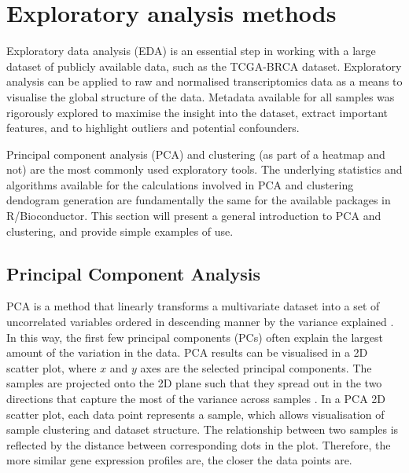     
    
    
\section{Exploratory analysis methods}
    
    Exploratory data analysis (EDA) is an essential step in working with a large dataset of publicly available data, such as the TCGA-BRCA dataset. Exploratory analysis can be applied to raw and normalised transcriptomics data as a means to visualise the global structure of the data. Metadata available for all samples was rigorously explored to maximise the insight into the dataset, extract important features, and to highlight outliers and potential confounders.
    
    Principal component analysis (PCA) and clustering (as part of a heatmap and not) are the most commonly used exploratory tools. The underlying statistics and algorithms available for the calculations involved in PCA and clustering dendogram generation are fundamentally the same for the available packages in R/Bioconductor. This section will present a general introduction to PCA and clustering, and provide simple examples of use.

    \subsection{Principal Component Analysis}
    
    PCA is a method that linearly transforms a multivariate dataset into a set of uncorrelated variables ordered in descending manner by the variance explained \cite{jolliffe2002principal}. In this way, the first few principal components (PCs) often explain the largest amount of the variation in the data. PCA results can be visualised in a 2D scatter plot, where $x$ and $y$ axes are the selected principal components. The samples are projected onto the 2D plane such that they spread out in the two directions that capture the most of the variance across samples \cite{Love2016RNA-SeqApproved}. 
    In a PCA 2D scatter plot, each data point represents a sample, which allows visualisation of sample clustering and dataset structure.  The relationship between two samples is reflected by the distance between corresponding dots in the plot. Therefore, the more similar gene expression profiles are, the closer the data points are.    
   
